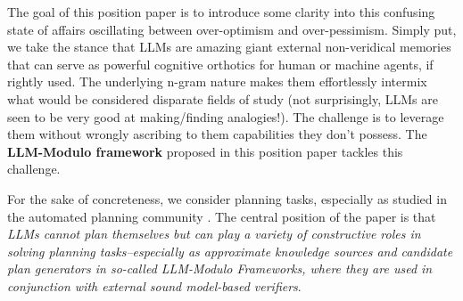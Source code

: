 \documentclass{article}
\newcommand{\rao}[1]{\noindent\textcolor{red}{#1}}
\theoremstyle{plain}
\theoremstyle{definition}
\theoremstyle{remark}
\begin{document}


The goal of this position paper is to introduce some clarity into this confusing state of affairs oscillating between over-optimism and over-pessimism. 
Simply put, we take the stance that 
LLMs are amazing giant external non-veridical memories that can serve as
powerful cognitive orthotics for human or machine agents, if rightly
used. The underlying n-gram nature makes them effortlessly intermix what
would be considered disparate fields of study (not surprisingly, LLMs
are seen to be very good at making/finding analogies!). The challenge is
to leverage them without wrongly ascribing to them capabilities they
don't possess. The {\bf LLM-Modulo framework} proposed in this position paper tackles this challenge.


For the sake of concreteness, we consider planning tasks, especially as studied in the automated planning community \cite{ghallab2004automated}. 
The central position of the paper is that \textit{LLMs cannot plan themselves but can play a variety of constructive roles in solving planning tasks--especially as approximate knowledge sources and candidate plan generators in so-called LLM-Modulo Frameworks, where they are used in conjunction with external sound model-based verifiers}.  
\end{document}
